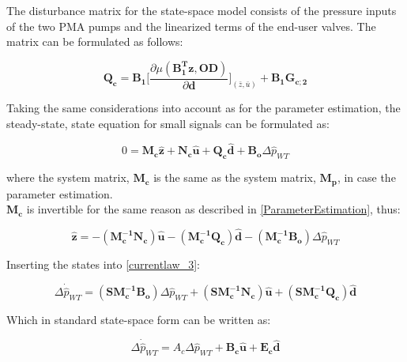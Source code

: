 The disturbance matrix for the state-space model consists of the pressure inputs of the two PMA pumps and the linearized terms of the end-user valves. The matrix can be formulated as follows: 

\begin{equation}
  \pmb{Q_c} = \pmb{B_1} \bigg[ \frac{\partial{\mu(\pmb{{B_1^{T}}}\pmb{z}, \pmb{OD})}}{{\partial{\pmb{d}}}}  \bigg]_{(\bar{z}, \bar{u})} + \pmb{B_1}\pmb{G_{c;2}}  
\label{disturbance_matrix}
\end{equation}

Taking the same considerations into account as for the parameter estimation, the steady-state, state equation for small signals can be formulated as: 

 \begin{equation}
 0 = \pmb{M_c} \pmb{\hat{z}} + \pmb{N_c} \pmb{\hat{u}} + \pmb{Q_c} \pmb{\hat{d}} + \pmb{B_o} \Delta \hat{p}_{WT}    
 \label{statespace_control_sys}
\end{equation}

where the system matrix, $\pmb{M_c}$ is the same as the system matrix, $\pmb{M_p}$, in case the parameter estimation. 
\\
$\pmb{M_c}$ is invertible for the same reason as described in \eqref{ParameterEstimation}, thus:

 \begin{equation}
 \pmb{\hat{z}} =  - (\pmb{M_c^{-1}}\pmb{N_c}) \pmb{\hat{u}} - (\pmb{M_c^{-1}}\pmb{Q_c}) \pmb{\hat{d}} - (\pmb{M_c^{-1}}\pmb{B_o}) \Delta \hat{p}_{WT}    
 \label{statespace_control_sys_state}
\end{equation}

Inserting the states into \eqref{currentlaw_3}:

 \begin{equation}
\Delta \dot{\hat{p}}_{WT} = (\pmb{S}\pmb{M_c^{-1}}\pmb{B_o}) \Delta \hat{p}_{WT}  + (\pmb{S}\pmb{M_c^{-1}}\pmb{N_c}) \pmb{\hat{u}} + (\pmb{S}\pmb{M_c^{-1}}\pmb{Q_c}) \pmb{\hat{d}} 
 \label{statespace_control_sys_state_1}
\end{equation}

Which in standard state-space form can be written as: 

 \begin{equation}
\Delta \dot{\hat{p}}_{WT} = A_c \Delta \hat{p}_{WT}  + \pmb{B_c} \pmb{\hat{u}} + \pmb{E_c} \pmb{\hat{d}} 
 \label{statespace_control_sys_state_2}
\end{equation}

